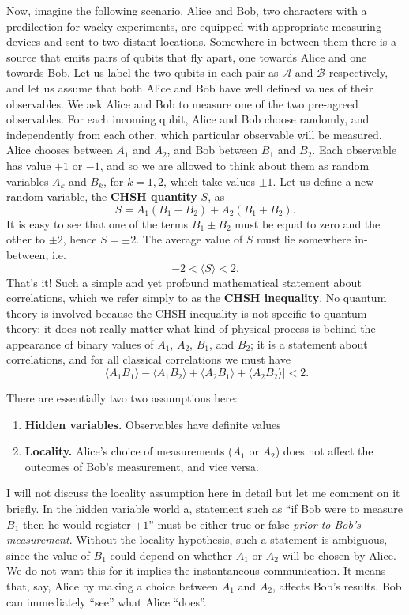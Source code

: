 \documentclass{article}
\providecommand{\tightlist}{%
  \setlength{\itemsep}{0pt}\setlength{\parskip}{0pt}}
\begin{document}
Now, imagine the following scenario.
Alice and Bob, two characters with a predilection for wacky experiments, are equipped with appropriate measuring devices and sent to two distant locations.
Somewhere in between them there is a source that emits pairs of qubits that fly apart, one towards Alice and one towards Bob.
Let us label the two qubits in each pair as \(\mathcal{A}\) and \(\mathcal{B}\) respectively, and let us assume that both Alice and Bob have well defined values of their observables.
We ask Alice and Bob to measure one of the two pre-agreed observables.
For each incoming qubit, Alice and Bob choose randomly, and independently from each other, which particular observable will be measured.
Alice chooses between \(A_1\) and \(A_2\), and Bob between \(B_1\) and \(B_2\).
Each observable has value \(+1\) or \(-1\), and so we are allowed to think about them as random variables \(A_k\) and \(B_k\), for \(k=1,2\), which take values \(\pm 1\).
Let us define a new random variable, the \textbf{CHSH quantity} \(S\), as
\[
  S = A_1(B_1 - B_2) + A_2(B_1 + B_2).
\]
It is easy to see that one of the terms \(B_1\pm B_2\) must be equal to zero and the other to \(\pm 2\), hence \(S=\pm2\).
The average value of \(S\) must lie somewhere in-between, i.e.
\[
  -2 < \langle S\rangle < 2.
\]
That's it!
Such a simple and yet profound mathematical statement about correlations, which we refer simply to as the \textbf{CHSH inequality}.
No quantum theory is involved because the CHSH inequality is not specific to quantum theory: it does not really matter what kind of physical process is behind the appearance of binary values of \(A_1\), \(A_2\), \(B_1\), and \(B_2\); it is a statement about correlations, and for all classical correlations we must have
\[
  |
    \langle A_1 B_1\rangle - \langle A_1 B_2\rangle + \langle A_2 B_1\rangle + \langle A_2 B_2\rangle
  | < 2.
\]

There are essentially two two assumptions here:

\begin{enumerate}
\def\labelenumi{\arabic{enumi}.}
\tightlist
\item
  \textbf{Hidden variables.} Observables have definite values
\item
  \textbf{Locality.} Alice's choice of measurements (\(A_1\) or \(A_2\)) does not affect the outcomes of Bob's measurement, and vice versa.
\end{enumerate}

I will not discuss the locality assumption here in detail but let me comment on it briefly.
In the hidden variable world a, statement such as ``if Bob were to measure \(B_1\) then he would register \(+1\)'' must be either true or false \emph{prior to Bob's measurement}.
Without the locality hypothesis, such a statement is ambiguous, since the value of \(B_1\) could depend on whether \(A_1\) or \(A_2\) will be chosen by Alice.
We do not want this for it implies the instantaneous communication.
It means that, say, Alice by making a choice between \(A_1\) and \(A_2\), affects Bob's results.
Bob can immediately ``see'' what Alice ``does''.
\end{document}
